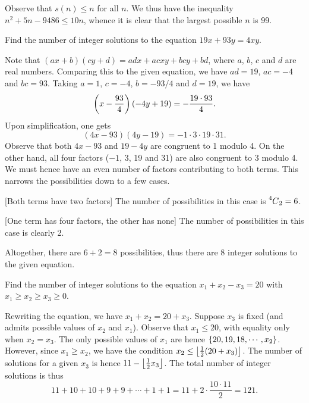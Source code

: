 Observe that $s(n) \leq n$ for all $n$. We thus have the inequality $n^2 + 5n - 9486 \leq 10 n$, whence it is clear that the largest possible $n$ is 99.

\begin{question}[8]\label{A::2022-O-1-17}
    Find the number of integer solutions to the equation $19x + 93y = 4xy$.
\end{question}

Note that $(ax+b)(cy+d) = adx + acxy + bcy + bd$, where $a$, $b$, $c$ and $d$ are real numbers. Comparing this to the given equation, we have $ad = 19$, $ac = -4$ and $bc = 93$. Taking $a = 1$, $c = -4$, $b = -93/4$ and $d = 19$, we have \[\left( x - \frac{93}{4} \right)(-4y + 19) = -\dfrac{19 \cdot 93}{4}.\] Upon simplification, one gets \[(4x - 93)(4y-19) = -1 \cdot 3 \cdot 19 \cdot 31.\] Observe that both $4x - 93$ and $19 - 4y$ are congruent to 1 modulo 4. On the other hand, all four factors ($-1$, 3, 19 and 31) are also congruent to 3 modulo 4. We must hence have an even number of factors contributing to both terms. This narrows the possibilities down to a few cases.

[Both terms have two factors] The number of possibilities in this case is $\prescript{4\mkern-0.5mu}{}C_{2} = 6$.

[One term has four factors, the other has none] The number of possibilities in this case is clearly 2.

Altogether, there are $6 + 2 = 8$ possibilities, thus there are 8 integer solutions to the given equation.

\begin{question}[121]\label{A::2022-O-1-18}
    Find the number of integer solutions to the equation $x_1 + x_2 - x_3 = 20$ with $x_1 \geq x_2 \geq x_3 \geq 0$.
\end{question}

Rewriting the equation, we have $x_1 + x_2 = 20 + x_3$. Suppose $x_3$ is fixed (and admits possible values of $x_2$ and $x_1$). Observe that $x_1 \leq 20$, with equality only when $x_2 = x_3$. The only possible values of $x_1$ are hence $\left\lbrace 20, 19, 18, \cdots, x_2 \right\rbrace$. However, since $x_1 \geq x_2$, we have the condition $x_2 \leq \left\lfloor \frac12 (20 + x_3) \right\rfloor$. The number of solutions for a given $x_3$ is hence $11 - \left\lfloor \frac12 x_3 \right\rfloor$. The total number of integer solutions is thus \[11 + 10 + 10 + 9 + 9 + \cdots + 1 + 1 = 11 + 2 \cdot \frac{10 \cdot 11}{2} = 121.\]

